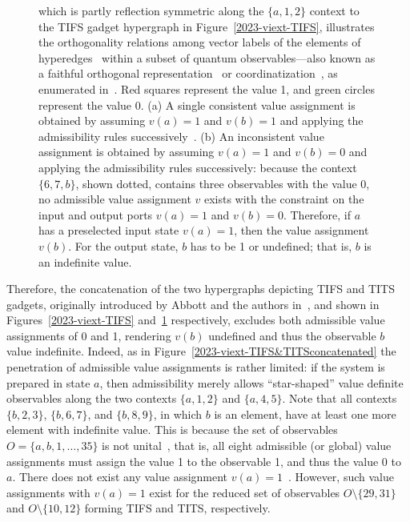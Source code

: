 \documentclass[%
 superscriptaddress,
  preprint,
 showpacs,
 showkeys,
 nofootinbib,
  amsmath,amssymb,
 pra,
  longbibliography,
  floatfix,
 ]{revtex4-2}
\theoremstyle{definition}
\begin{document}
\begin{figure}
{which is partly reflection symmetric along the $\{a,1,2\}$ context to the TIFS gadget hypergraph in Figure~\ref{2023-viext-TIFS},
illustrates the orthogonality relations among vector labels of the elements of hyperedges~\cite{lovasz-79}
within a subset of quantum observables---also known as a faithful orthogonal representation~\cite{Portillo-2015} or coordinatization~\cite{Pavii2018},
as enumerated in~\cite[Table~I]{2018-minimalYIYS}. Red squares represent the value 1, and green circles represent the value 0.
(a) A single consistent value assignment is obtained by assuming $v(a)=1$ and $v(b)=1$ and applying the admissibility rules successively~\cite[Figure~(24.2.b)]{Svozil-2018-p}.
(b) An inconsistent value assignment is obtained by assuming $v(a)=1$ and $v(b)=0$ and applying the admissibility rules successively:
because the context $\{6,7,b\}$, shown dotted, contains three observables with the value 0,
no admissible value assignment $v$ exists with the constraint on the input and output ports $v(a)=1$ and $v(b)=0$.
Therefore, if $a$ has a preselected input state $v(a)=1$, then the value assignment $v(b)$.
For the output state, $b$ has to be 1 or undefined; that is, $b$ is an indefinite value.
}
                \label{2023-viext-TITS}
        \end{figure}





Therefore, the concatenation of the two hypergraphs depicting TIFS and TITS gadgets,
originally introduced by Abbott and the authors in~\cite{2018-minimalYIYS}, and
shown in Figures~\ref{2023-viext-TIFS} and~\ref{2023-viext-TITS} respectively, excludes both admissible value assignments of 0 and 1,
rendering $v(b)$ undefined and thus the observable $b$ value indefinite.
Indeed, as in Figure~\ref{2023-viext-TIFS&TITSconcatenated}
the penetration of admissible value assignments is rather limited: if the system is prepared in state $a$, then admissibility merely allows
``star-shaped'' value definite observables along the two contexts $\{a,1,2\}$ and $\{a,4,5\}$.
Note that all contexts
$\{b,2,3\}$,
$\{b,6,7\}$, and
$\{b,8,9\}$,
in which $b$ is an element, have at least one more element with indefinite value.
This is because
the set of observables $O=\{ a,b, 1,\ldots , 35\}$ is not unital~\cite{svozil-tkadlec}, that is, all eight admissible (or global) value assignments must assign the value 1 to the observable 1,
and thus the value 0 to $a$.
There does not exist any value assignment  $v(a)=1$~\cite[Table~24.1]{Svozil-2018-p}.
However, such value assignments with  $v(a)=1$ exist for the reduced set of observables
$O  \setminus \{29,31\}$
and
$O  \setminus \{10,12\}$
forming TIFS and TITS, respectively.
\end{document}
